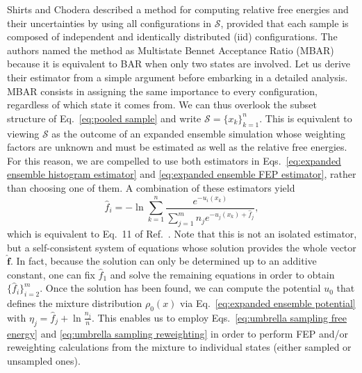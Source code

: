 \documentclass[aip,jcp,preprint,amsmath,amssymb]{revtex4-1}
\newcommand{\vt}[1]{\boldsymbol{\mathbf{#1}}}           %
\begin{document}
Shirts and Chodera\cite{Shirts_2008} described a method for computing relative free energies and their uncertainties by using all configurations in $\mathcal S$, provided that each sample is composed of independent and identically distributed (iid) configurations. The authors named the method as Multistate Bennet Acceptance Ratio (MBAR) because it is equivalent to BAR when only two states are involved. Let us derive their estimator from a simple argument before embarking in a detailed analysis. MBAR consists in assigning the same importance to every configuration, regardless of which state it comes from. We can thus overlook the subset structure of Eq.~\eqref{eq:pooled sample} and write $\mathcal S = \{x_k\}_{k=1}^n$. This is equivalent to viewing $\mathcal S$ as the outcome of an expanded ensemble simulation whose weighting factors are unknown and must be estimated as well as the relative free energies. For this reason, we are compelled to use both estimators in Eqs.~\eqref{eq:expanded ensemble histogram estimator} and \eqref{eq:expanded ensemble FEP estimator}, rather than choosing one of them. A combination of these estimators yield
\begin{equation}
\label{eq:mbar free energy estimator}
\hat f_i = -\ln \sum_{k=1}^n \frac{e^{-u_i(x_k)}}{\sum_{j=1}^m n_j e^{-u_j(x_k) + \hat f_j}},
\end{equation}
which is equivalent to Eq.~11 of Ref.~. Note that this is not an isolated estimator, but a self-consistent system of equations whose solution provides the whole vector $\hat {\vt f}$. In fact, because the solution can only be determined up to an additive constant, one can fix $\hat f_1$ and solve the remaining equations in order to obtain $\{\hat f_i\}_{i=2}^m$. Once the solution has been found, we can compute the potential $u_0$ that defines the mixture distribution $\rho_0(x)$ via Eq.~\eqref{eq:expanded ensemble potential} with $\eta_j = \hat f_j + \ln \frac{n_j}{n}$. This enables us to employ Eqs.~\eqref{eq:umbrella sampling free energy} and \eqref{eq:umbrella sampling reweighting} in order to perform FEP and/or reweighting calculations from the mixture to individual states (either sampled or unsampled ones).\cite{Geyer_1994, Shirts_2017}
\end{document}
